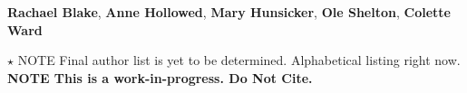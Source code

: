 \textbf{Rachael Blake}, 
\textbf{Anne Hollowed}, 
\textbf{Mary Hunsicker}, 
\textbf{Ole Shelton}, 
\textbf{Colette Ward}

$\star$ NOTE Final author list is yet to be determined. Alphabetical listing right now. 
\textbf {NOTE This is a work-in-progress.  Do Not Cite.}  
